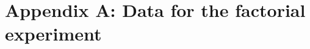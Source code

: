 \documentclass[11pt]{article}
\begin{document}

\clearpage

\section*{Appendix A: Data for the factorial experiment}
\label{sec:appa}


\end{document}
